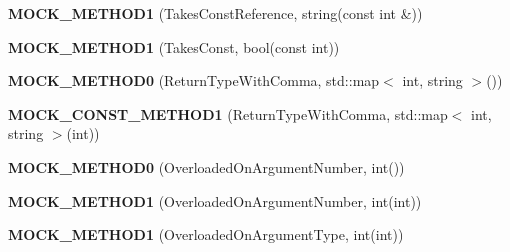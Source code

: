 \begin{DoxyCompactItemize}
{\bfseries M\+O\+C\+K\+\_\+\+M\+E\+T\+H\+O\+D1} (Takes\+Const\+Reference, string(const int \&))
\item 
\mbox{\label{classtesting_1_1gmock__generated__function__mockers__test_1_1_mock_foo_a7b548776b156454bcddecaca6294c52f}} 
{\bfseries M\+O\+C\+K\+\_\+\+M\+E\+T\+H\+O\+D1} (Takes\+Const, bool(const int))
\item 
\mbox{\label{classtesting_1_1gmock__generated__function__mockers__test_1_1_mock_foo_a5fb8c71ba44b97fbc8945905a9835215}} 
{\bfseries M\+O\+C\+K\+\_\+\+M\+E\+T\+H\+O\+D0} (Return\+Type\+With\+Comma, std\+::map$<$ int, string $>$())
\item 
\mbox{\label{classtesting_1_1gmock__generated__function__mockers__test_1_1_mock_foo_a777b7b57ac125e2fe868e6cda46833fc}} 
{\bfseries M\+O\+C\+K\+\_\+\+C\+O\+N\+S\+T\+\_\+\+M\+E\+T\+H\+O\+D1} (Return\+Type\+With\+Comma, std\+::map$<$ int, string $>$(int))
\item 
\mbox{\label{classtesting_1_1gmock__generated__function__mockers__test_1_1_mock_foo_a1666c565d1b48b351a1a453f6f87ff22}} 
{\bfseries M\+O\+C\+K\+\_\+\+M\+E\+T\+H\+O\+D0} (Overloaded\+On\+Argument\+Number, int())
\item 
\mbox{\label{classtesting_1_1gmock__generated__function__mockers__test_1_1_mock_foo_a45014dba5c27e9d59af3a94e0d324096}} 
{\bfseries M\+O\+C\+K\+\_\+\+M\+E\+T\+H\+O\+D1} (Overloaded\+On\+Argument\+Number, int(int))
\item 
\mbox{\label{classtesting_1_1gmock__generated__function__mockers__test_1_1_mock_foo_ad900c5945fc52a0a95ca1480207c7add}} 
{\bfseries M\+O\+C\+K\+\_\+\+M\+E\+T\+H\+O\+D1} (Overloaded\+On\+Argument\+Type, int(int))
\item 
\mbox{\label{classtesting_1_1gmock__generated__function__mockers__test_1_1_mock_foo_ab4b323a9c06a48c1116d55419195c1a6}} 

\end{DoxyCompactItemize}
